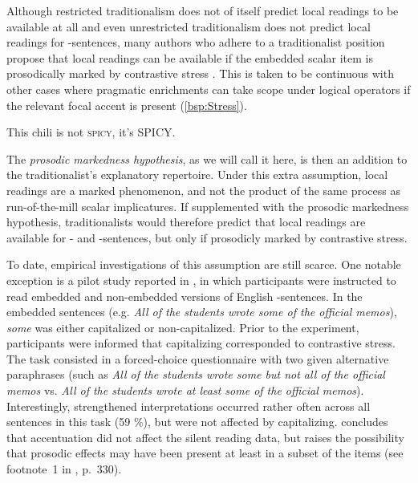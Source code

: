 \documentclass[fleqn,reqno,10pt]{article}
\newcommand{\as}{\acro{as}}
\renewcommand{\es}{\acro{es}}
\begin{document}
Although restricted traditionalism does not of itself predict local
readings to be available at all and even unrestricted traditionalism
does not predict local readings for \es-sentences, many authors who
adhere to a traditionalist position propose that local readings can be
available if the embedded scalar item is prosodically marked by
contrastive stress
\citep[e.g.][]{Horn2006:The-Border-Wars,Geurts2009:Scalar-Implicat,Geurts2010:Quantity-Implic,GeurtsTielvan-Tiel2013:Embedded-Scalar}. This
is taken to be continuous with other cases where pragmatic enrichments
can take scope under logical operators if the relevant focal accent is
present (\ref{bsp:Stress}).

\begin{exe}
\ex \label{bsp:Stress} This chili is not \textsc{spicy}, it's \textsc{SPICY}.
\end{exe}

\noindent The \emph{prosodic markedness hypothesis}, as we will call
it here, is then an addition to the traditionalist's explanatory
repertoire. Under this extra assumption, local readings are a marked
phenomenon, and not the product of the same process as run-of-the-mill
scalar implicatures. If supplemented with the prosodic markedness
hypothesis, traditionalists would therefore predict that local
readings are available for \as- and \es-sentences, but only if
prosodicly marked by contrastive stress.

To date, empirical investigations of this assumption are still scarce.  One
notable exception is a pilot study reported in
\citet{Frazier08}, in which participants were instructed to read
embedded and non-embedded versions of English \as-sentences. In the
embedded sentences (e.g. {\it All of the students wrote some of the
  official memos}), {\it some} was either capitalized or
non-capitalized. Prior to the experiment, participants were informed
that capitalizing corresponded to contrastive stress. The task
consisted in a forced-choice questionnaire with two given alternative
paraphrases  (such as {\it All of the students wrote some but not all of the
  official memos} vs. {\it All of the students wrote at least some of
  the official memos}). Interestingly, strengthened interpretations
occurred rather often across all sentences in this task (59 \%), but
were not affected by capitalizing.
\citeauthor{Frazier08} concludes that accentuation did not affect the
silent reading data, but raises the possibility that prosodic effects
may have been present at least in a subset of the items (see
footnote~1 in \citet{Frazier08}, p.~330).
\end{document}
